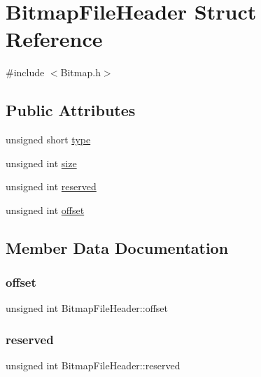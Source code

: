 \hypertarget{struct_bitmap_file_header}{}\section{Bitmap\+File\+Header Struct Reference}
\label{struct_bitmap_file_header}


{\ttfamily \#include $<$Bitmap.\+h$>$}

\subsection*{Public Attributes}
\begin{DoxyCompactItemize}
\item 
unsigned short \hyperlink{struct_bitmap_file_header_a139c2c2645bc00ddf4f5dc552872c1d1}{type}
\item 
unsigned int \hyperlink{struct_bitmap_file_header_a0dcad71d9b17783c4d296c2c6d00ede0}{size}
\item 
unsigned int \hyperlink{struct_bitmap_file_header_ab3833d77e2c28a216859a80ba8fac9f0}{reserved}
\item 
unsigned int \hyperlink{struct_bitmap_file_header_a26ed598693b100ffd9e29c4dc77f3d92}{offset}
\end{DoxyCompactItemize}


\subsection{Member Data Documentation}
\hypertarget{struct_bitmap_file_header_a26ed598693b100ffd9e29c4dc77f3d92}{}\label{struct_bitmap_file_header_a26ed598693b100ffd9e29c4dc77f3d92} 
\subsubsection{\texorpdfstring{offset}{offset}}
{\footnotesize\ttfamily unsigned int Bitmap\+File\+Header\+::offset}

\hypertarget{struct_bitmap_file_header_ab3833d77e2c28a216859a80ba8fac9f0}{}\label{struct_bitmap_file_header_ab3833d77e2c28a216859a80ba8fac9f0} 
\subsubsection{\texorpdfstring{reserved}{reserved}}
{\footnotesize\ttfamily unsigned int Bitmap\+File\+Header\+::reserved}

